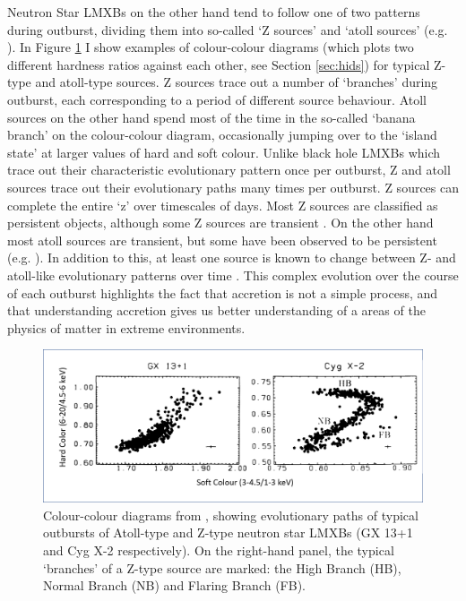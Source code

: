 \par Neutron Star LMXBs on the other hand tend to follow one of two patterns during outburst, dividing them into so-called `Z sources' and `atoll sources' (e.g. \citealp{vanderKlis_ZAtoll}).  In Figure \ref{fig:Zatoll} I show examples of colour-colour diagrams (which plots two different hardness ratios against each other, see Section \ref{sec:hids}) for typical Z-type and atoll-type sources.  Z sources trace out a number of `branches' during outburst, each corresponding to a period of different source behaviour.  Atoll sources on the other hand spend most of the time in the so-called `banana branch' on the colour-colour diagram, occasionally jumping over to the `island state' at larger values of hard and soft colour.  Unlike black hole LMXBs which trace out their characteristic evolutionary pattern once per outburst, Z and atoll sources trace out their evolutionary paths many times per outburst.  Z sources can complete the entire `z' over timescales of days.  Most Z sources are classified as persistent objects, although some Z sources are transient \citep{Homan_TZ}.  On the other hand most atoll sources are transient, but some have been observed to be persistent (e.g. \citealp{Hasinger_PersAtoll}).  In addition to this, at least one source is known to change between Z- and atoll-like evolutionary patterns over time \citep{Barret_Flip}.  This complex evolution over the course of each outburst highlights the fact that accretion is not a simple process, and that understanding accretion gives us better understanding of a areas of the physics of matter in extreme environments.

\begin{figure}
   \centering
    \includegraphics[width=\columnwidth, trim = 1mm 1mm 1mm 1mm, clip]{images/Zatoll.png}
    \captionsetup{singlelinecheck=off}
    \caption[Colour-Colour diagrams from \citet{vanderKlis_ZAtoll} showing typical evolutionary paths of Atoll-type and Z-type Neutron Star LMXBs.]{Colour-colour diagrams from \citet{vanderKlis_ZAtoll}, showing evolutionary paths of typical outbursts of Atoll-type and Z-type neutron star LMXBs (GX 13+1 and Cyg X-2 respectively).  On the right-hand panel, the typical `branches' of a Z-type source are marked: the High Branch (HB), Normal Branch (NB) and Flaring Branch (FB).}
   \label{fig:Zatoll}
\end{figure}

